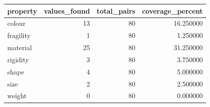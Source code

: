 \begin{tabular}{lrrr}
\toprule
property & values_found & total_pairs & coverage_percent \\
\midrule
colour & 13 & 80 & 16.250000 \\
fragility & 1 & 80 & 1.250000 \\
material & 25 & 80 & 31.250000 \\
rigidity & 3 & 80 & 3.750000 \\
shape & 4 & 80 & 5.000000 \\
size & 2 & 80 & 2.500000 \\
weight & 0 & 80 & 0.000000 \\
\bottomrule
\end{tabular}
